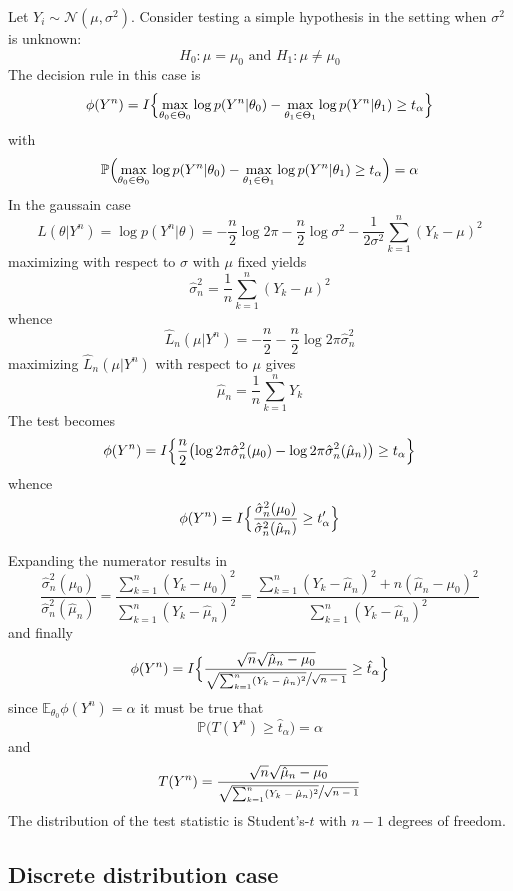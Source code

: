 \documentclass[a4paper]{article}
\newcommand{\Ncal}{\mathcal{N}}
\newcommand{\ex}{\mathbb{E}}
\newcommand{\pr}{\mathbb{P}}
\begin{document}
Let $Y_i\sim \Ncal(\mu, \sigma^2)$. Consider testing a simple hypothesis in the
setting when $\sigma^2$ is unknown:
\[H_0: \mu=\mu_0\text{ and }H_1: \mu\neq \mu_0\]
The decision rule in this case is
\[
\phi(Y^n) = I\Bigl\{ 
\max_{\theta_0\in \Theta_0} \log p(Y^n|\theta_0) - \max_{\theta_1\in \Theta_1} \log p(Y^n|\theta_1) \geq t_\alpha
\Bigr\}
\]
with 
\[
\pr\Bigl( \max_{\theta_0\in \Theta_0} \log p(Y^n|\theta_0) - \max_{\theta_1\in \Theta_1} \log p(Y^n|\theta_1) \geq t_\alpha \Bigr) = \alpha
\]
In the gaussain case 
\[
L(\theta|Y^n)
= \log p(Y^n|\theta)
= - \frac{n}{2} \log 2\pi
  - \frac{n}{2} \log \sigma^2
  - \frac{1}{2\sigma^2} \sum_{k=1}^n (Y_k - \mu)^2
\]
maximizing with respect to $\sigma$ with $\mu$ fixed yields
\[\hat{\sigma}^2_n = \frac{1}{n} \sum_{k=1}^n (Y_k - \mu)^2\]
whence
\[ \hat{L}_n(\mu|Y^n) = - \frac{n}{2} - \frac{n}{2} \log 2\pi \hat{\sigma}^2_n \]
maximizing $\hat{L}_n(\mu|Y^n)$ with respect to $\mu$ gives
\[
\hat{\mu}_n
= \frac{1}{n}\sum_{k=1}^n Y_k
\]
The test becomes
\[
\phi(Y^n)
 = I\Bigl\{ 
\frac{n}{2} \bigl( \log 2\pi \hat{\sigma}^2_n(\mu_0) 
 - \log 2\pi \hat{\sigma}^2_n(\hat{\mu}_n) \bigr)
\geq t_\alpha
\Bigr\}
\]
whence
\[
\phi(Y^n)
 = I\Bigl\{ 
\frac{\hat{\sigma}^2_n(\mu_0)}{\hat{\sigma}^2_n(\hat{\mu}_n)}
\geq t_\alpha'
\Bigr\}
\]

Expanding the numerator results in
\[
\frac{\hat{\sigma}^2_n(\mu_0)}{\hat{\sigma}^2_n(\hat{\mu}_n)}
= \frac{\sum_{k=1}^n (Y_k - \mu_0)^2}{\sum_{k=1}^n (Y_k - \hat{\mu}_n)^2}
= \frac{\sum_{k=1}^n (Y_k - \hat{\mu}_n)^2 + n( \hat{\mu}_n -\mu_0 )^2}{\sum_{k=1}^n (Y_k - \hat{\mu}_n)^2}
\]
and finally 
\[
\phi(Y^n)
 = I\Bigl\{ 
\frac{\sqrt{n} \sqrt{\hat{\mu}_n -\mu_0} }{\sfrac{\sqrt{\sum_{k=1}^n (Y_k - \hat{\mu}_n)^2}}{\sqrt{n-1}} }
\geq \hat{t}_\alpha
\Bigr\}
\]
since $\ex_{\theta_0}\phi(Y^n) = \alpha$ it must be true that
\[\pr\bigl(T(Y^n) \geq \hat{t}_\alpha\bigr) = \alpha\]
and 
\[
T(Y^n)
= \frac{\sqrt{n} \sqrt{\hat{\mu}_n -\mu_0} }{\sfrac{\sqrt{\sum_{k=1}^n (Y_k - \hat{\mu}_n)^2}}{\sqrt{n-1}} }
\]
The distribution of the test statistic is Student's-$t$ with $n-1$ degrees of freedom.


\subsection{Discrete distribution case} %
\label{sub:discrete_distribution_case}
\end{document}
